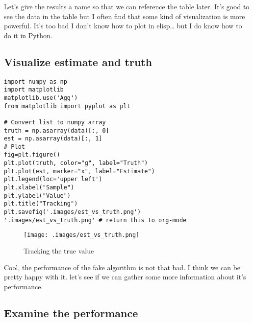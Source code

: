\documentclass[11pt]{article}
\begin{document}
Let's give the results a name so that we can reference the table later. It's
good to see the data in the table but I often find that some kind of
visualization is more powerful. It's too bad I don't know how to plot in
elisp\ldots{} but I do know how to do it in Python.

\subsection*{Visualize estimate and truth}
\label{sec:org0903e34}
\begin{verbatim}
import numpy as np
import matplotlib
matplotlib.use('Agg')
from matplotlib import pyplot as plt

# Convert list to numpy array
truth = np.asarray(data)[:, 0]
est = np.asarray(data)[:, 1]
# Plot
fig=plt.figure()
plt.plot(truth, color="g", label="Truth")
plt.plot(est, marker="x", label="Estimate")
plt.legend(loc='upper left')
plt.xlabel("Sample")
plt.ylabel("Value")
plt.title("Tracking")
plt.savefig('.images/est_vs_truth.png')
'.images/est_vs_truth.png' # return this to org-mode
\end{verbatim}

\begin{figure}[htbp]
\centering
\texttt{[image: .images/est\_vs\_truth.png]}
\caption{Tracking the true value}
\end{figure}

Cool, the performance of the fake algorithm is not that bad. I think we can be
pretty happy with it. let's see if we can gather some more information about
it's performance.

\subsection*{Examine the performance}
\label{sec:orgb922c60}
\end{document}
